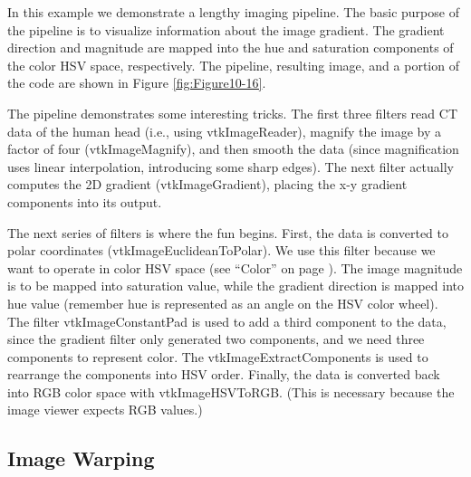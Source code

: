 In this example we demonstrate a lengthy imaging pipeline. The basic purpose of the pipeline is to visualize information about the image gradient. The gradient direction and magnitude are mapped into the hue and saturation components of the color HSV space, respectively. The pipeline, resulting image, and a portion of the code are shown in Figure \ref{fig:Figure10-16}.

The pipeline demonstrates some interesting tricks. The first three filters read CT data of the human head (i.e., using vtkImageReader), magnify the image by a factor of four (vtkImageMagnify), and then smooth the data (since magnification uses linear interpolation, introducing some sharp edges). The next filter actually computes the 2D gradient (vtkImageGradient), placing the x-y gradient components into its output.

The next series of filters is where the fun begins. First, the data is converted to polar coordinates (vtkImageEuclideanToPolar). We use this filter because we want to operate in color HSV space (see ``Color'' on page \pageref{sec:color}). The image magnitude is to be mapped into saturation value, while the gradient direction is mapped into hue value (remember hue is represented as an angle on the HSV color wheel). The filter vtkImageConstantPad is used to add a third component to the data, since the gradient filter only generated two components, and we need three components to represent color. The vtkImageExtractComponents is used to rearrange the components into HSV order. Finally, the data is converted back into RGB color space with vtkImageHSVToRGB. (This is necessary because the image viewer expects RGB values.)

\subsection{Image Warping}

